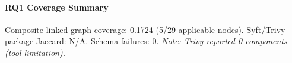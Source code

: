 \paragraph{RQ1 Coverage Summary}
Composite linked-graph coverage: 0.1724 (5/29 applicable nodes). Syft/Trivy package Jaccard: N/A. Schema failures: 0.
\textit{Note: Trivy reported 0 components (tool limitation).}